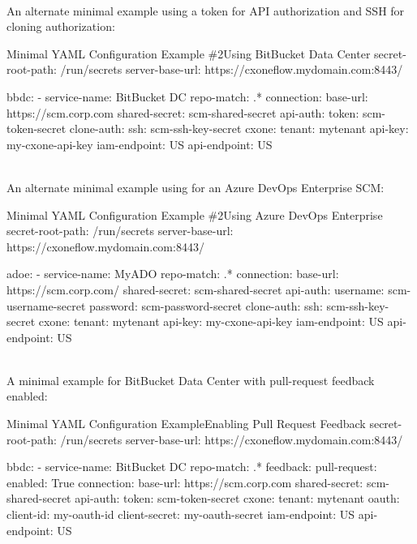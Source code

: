 \pagebreak
\noindent\\An alternate minimal example using a token for API authorization and SSH for cloning authorization:

\begin{code}{Minimal YAML Configuration Example \#2}{Using BitBucket Data Center}{}
secret-root-path: /run/secrets
server-base-url: https://cxoneflow.mydomain.com:8443/

bbdc:
    - service-name: BitBucket DC
      repo-match: .*
      connection:
      base-url: https://scm.corp.com
      shared-secret: scm-shared-secret
      api-auth:
        token: scm-token-secret
      clone-auth:
        ssh: scm-ssh-key-secret
      cxone:
        tenant: mytenant
        api-key: my-cxone-api-key
        iam-endpoint: US
        api-endpoint: US
\end{code}
    
\pagebreak
\noindent\\An alternate minimal example using for an Azure DevOps Enterprise
SCM:

\begin{code}{Minimal YAML Configuration Example \#2}{Using Azure DevOps Enterprise}{}
secret-root-path: /run/secrets
server-base-url: https://cxoneflow.mydomain.com:8443/

adoe:
    - service-name: MyADO
      repo-match: .*
      connection:
      base-url: https://scm.corp.com/
      shared-secret: scm-shared-secret
      api-auth:
        username: scm-username-secret
        password: scm-password-secret
      clone-auth:
        ssh: scm-ssh-key-secret
      cxone:
        tenant: mytenant
        api-key: my-cxone-api-key
        iam-endpoint: US
        api-endpoint: US
\end{code}

\pagebreak
\noindent\\A minimal example for BitBucket Data Center with pull-request feedback enabled:

\begin{code}{Minimal YAML Configuration Example}{Enabling Pull Request Feedback}{}
secret-root-path: /run/secrets
server-base-url: https://cxoneflow.mydomain.com:8443/

bbdc:
    - service-name: BitBucket DC
      repo-match: .*
      feedback:
        pull-request:
          enabled: True
      connection:
        base-url: https://scm.corp.com
        shared-secret: scm-shared-secret
        api-auth:
          token: scm-token-secret
      cxone:
        tenant: mytenant
        oauth:
          client-id: my-oauth-id
          client-secret: my-oauth-secret
        iam-endpoint: US
        api-endpoint: US
\end{code}

